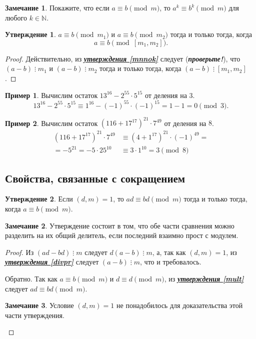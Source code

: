 \documentclass[14pt, a4paper]{extarticle}
\theoremstyle{definition}
\newtheorem*{remark}{Замечание}
\newtheorem{example}{Пример}
\newtheorem{statement}{Утверждение}
\newcommand{\divisible}{\mathop{\vdots}}
\begin{document}
	\begin{remark}
		Покажите, что если $a\equiv b\pmod{m}$, то $a^k\equiv b^k\pmod{m}$ для любого $k\in\mathbb{N}$.
	\end{remark}

	\begin{statement}
		$a\equiv b\pmod{m_1}$ и $a\equiv b\pmod{m_2}$ тогда и только тогда, когда $$a\equiv b\pmod{[m_1,m_2]}.$$
	\end{statement}
	\begin{proof}
		Действительно, из \hyperref[mnnok]{\textbf{\textit{утверждения \ref*{mnnok}}}} следует (\textbf{\textit{про\-верьте!}}), что $(a-b)\divisible m_1$ и $(a-b)\divisible m_2$ тогда и только тогда, когда $(a-b)\divisible[m_1,m_2]$.
	\end{proof}

	\begin{example}
		Вычислим остаток $13^{16}-2^{55}\cdot5^{15}$ от деления на $3$.
		$$13^{16}-2^{55}\cdot5^{15}\equiv1^{16}-(-1)^{55}\cdot(-1)^{15}=1-1=0\pmod{3}.$$
	\end{example}

	\begin{example}
		Вычислим остаток $(116+17^{17})^{21}\cdot7^{49}$ от деления на $8$.
		\begin{align*}
			(116+17^{17})^{21}\cdot7^{49}&\equiv(4+1^{17})^{21}\cdot(-1)^{49}=\\
			=-5^{21}=-5\cdot25^{10}&\equiv3\cdot1^{10}=3\pmod{8}
		\end{align*}
	\end{example}

\subsection{Свойства, связанные с сокращением}
\label{skrsr}

	\begin{statement}
	\label{sokrmod}
		Если $(d,m)=1$, то $ad\equiv bd\pmod{m}$ тогда и только тогда, когда \mbox{$a\equiv b\pmod{m}$}.
	\end{statement}
	\begin{remark}
		Утверждение состоит в том, что обе части сравнения можно разделить на их общий делитель, если последний взаимно прост с модулем.
	\end{remark}
	\begin{proof}
		Из $(ad-bd)\divisible m$ следует $d(a-b)\divisible m$, а, так как $(d,m)=1$, из \hyperref[divpr]{\textbf{\textit{утверждения \ref*{divpr}}}} следует $(a-b)\divisible m$, что и требовалось.
		
		Обратно. Так как $a\equiv b\pmod{m}$ и $d\equiv d\pmod{m}$, из \hyperref[mult]{\textbf{\textit{утверждения \ref*{mult}}}} следует $ad\equiv bd\pmod{m}$.
		\begin{remark}
			Условие $(d,m)=1$ не понадобилось для доказательства этой части утверждения.
		\end{remark}
	\end{proof}
\end{document}
